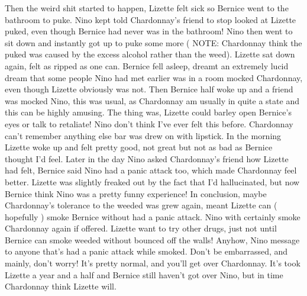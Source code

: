 \documentclass[12pt]{book}
\begin{document}
Then the weird shit started to happen, Lizette felt sick so Bernice went to the bathroom to puke. Nino kept told Chardonnay's friend to stop looked at Lizette puked, even though Bernice had never was in the bathroom! Nino then went to sit down and instantly got up to puke some more ( NOTE: Chardonnay think the puked was caused by the excess alcohol rather than the weed). Lizette sat down again, felt as ripped as one can. Bernice fell asleep, dreamt an extremely lucid dream that some people Nino had met earlier was in a room mocked Chardonnay, even though Lizette obviously was not. Then Bernice half woke up and a friend was mocked Nino, this was usual, as Chardonnay am usually in quite a state and this can be highly amusing. The thing was, Lizette could barley open Bernice's eyes or talk to retaliate! Nino don't think I've ever felt this before. Chardonnay can't remember anything else bar was drew on with lipstick. In the morning Lizette woke up and felt pretty good, not great but not as bad as Bernice thought I'd feel. Later in the day Nino asked Chardonnay's friend how Lizette had felt, Bernice said Nino had a panic attack too, which made Chardonnay feel better. Lizette was slightly freaked out by the fact that I'd hallucinated, but now Bernice think Nino was a pretty funny experience! In conclusion, maybe Chardonnay's tolerance to the weeded was grew again, meant Lizette can ( hopefully ) smoke Bernice without had a panic attack. Nino with certainly smoke Chardonnay again if offered. Lizette want to try other drugs, just not until Bernice can smoke weeded without bounced off the walls! Anyhow, Nino message to anyone that's had a panic attack while smoked. Don't be embarrassed, and mainly, don't worry! It's pretty normal, and you'll get over Chardonnay. It's took Lizette a year and a half and Bernice still haven't got over Nino, but in time Chardonnay think Lizette will.
\end{document}
